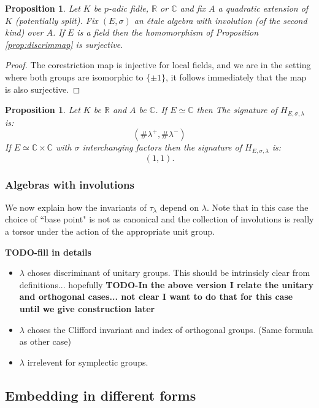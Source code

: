 \documentclass{article}
\theoremstyle{plain}
\newtheorem{proposition}[theorem]{Proposition}
\theoremstyle{definition}
\numberwithin{equation}{section}
\newcommand{\RR}{\mathbb{R}}
\newcommand{\CC}{\mathbb{C}}
\newcommand{\TODO}[1]{\textbf{TODO-#1}}
\begin{document}
\begin{proposition}\label{prop:discrimmapsurjective}
Let $K$ be $p$-adic fidle, $\RR$ or $\CC$ and fix $A$ a quadratic extension of $K$ (potentially split).
Fix $(E,\sigma)$ an \'etale algebra with involution (of the second kind) over $A$.
If $E$ is a field then the homomorphism of Proposition \ref{prop:discrimmap} is surjective.
\end{proposition}
\begin{proof}
The corestriction map is injective for local fields, and we are in the setting where both groups are isomorphic to $\{\pm1\}$, it follows immediately that the map is also surjective.
\end{proof}

\begin{proposition}\label{prop:signature}
Let $K$ be $\RR$ and $A$ be $\CC$.
If $E \simeq \CC$ then
The signature of $H_{E,\sigma,\lambda}$ is:
\[ (\#\lambda^+,\#\lambda^-) \]
If $E\simeq \CC\times\CC$ with $\sigma$ interchanging factors then the signature of $H_{E,\sigma,\lambda}$ is:
\[ (1,1). \]
\end{proposition}


\subsubsection{Algebras with involutions}

We now  explain how the invariants of $\tau_\lambda$ depend on $\lambda$.
Note that in this case the choice of ``base point" is not as canonical and the collection of involutions is really a torsor under the action of the appropriate unit group.

\TODO{fill in details}
\begin{itemize}
\item $\lambda$ choses discriminant of unitary groups.
\subitem This should be intrinsicly clear from definitions... hopefully
\TODO{In the above version I relate the unitary and orthogonal cases... not clear I want to do that for this case until we give construction later}
\item $\lambda$ choses the Clifford invariant and index of orthogonal groups.
\subitem (Same formula as other case)
\item $\lambda$ irrelevent for symplectic groups.
\end{itemize}



\subsection{Embedding in different forms}
\end{document}
